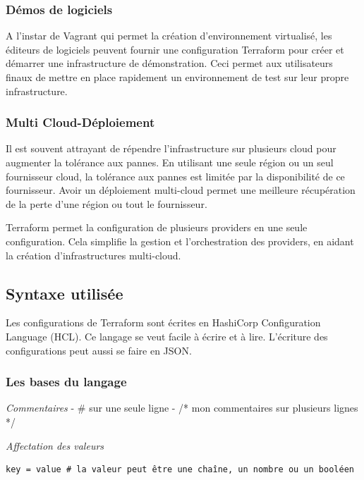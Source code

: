 \documentclass[]{article}
\begin{document}
\subsubsection{Démos de logiciels}\label{duxe9mos-de-logiciels}

A l'instar de Vagrant qui permet la création d'environnement virtualisé,
les éditeurs de logiciels peuvent fournir une configuration Terraform
pour créer et démarrer une infrastructure de démonstration. Ceci permet
aux utilisateurs finaux de mettre en place rapidement un environnement
de test sur leur propre infrastructure.

\subsubsection{Multi
Cloud-Déploiement}\label{multi-cloud-duxe9ploiement}

Il est souvent attrayant de répendre l'infrastructure sur plusieurs
cloud pour augmenter la tolérance aux pannes. En utilisant une seule
région ou un seul fournisseur cloud, la tolérance aux pannes est
limitée par la disponibilité de ce fournisseur. Avoir un déploiement
multi-cloud permet une meilleure récupération de la perte d'une région
ou tout le fournisseur.

Terraform permet la configuration de plusieurs providers en une seule
configuration. Cela simplifie la gestion et l'orchestration des
providers, en aidant la création d'infrastructures multi-cloud.

\subsection{Syntaxe utilisée}\label{syntaxe-utilisuxe9}

Les configurations de Terraform sont écrites en HashiCorp Configuration
Language (HCL). Ce langage se veut facile à écrire et à lire. L'écriture
des configurations peut aussi se faire en JSON.

\subsubsection{Les bases du langage}\label{les-bases-du-langage}

\emph{Commentaires} - \# sur une seule ligne - /* mon commentaires sur
plusieurs lignes */

\emph{Affectation des valeurs}

\begin{verbatim}
key = value # la valeur peut être une chaîne, un nombre ou un booléen
\end{verbatim}
\end{document}
